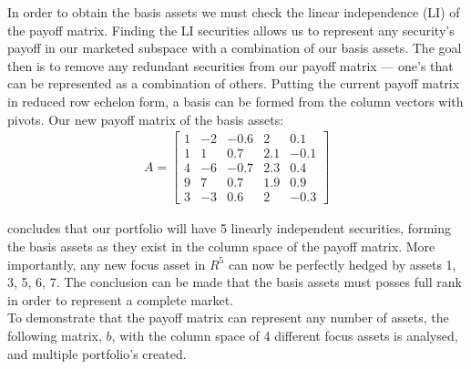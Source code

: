 \documentclass[a4paper,11pt]{report}
\begin{document}
\begin{multicols}{2}
 In order to obtain the basis assets we must check the linear independence (LI) of the payoff matrix. 
Finding the LI securities allows us to represent any security's payoff in our marketed subspace with a combination of our basis assets.
The goal then is to remove any redundant securities from our payoff matrix --- one's that can be represented as a combination of others. 
Putting the current payoff matrix in reduced row echelon form, a basis can be formed from the column vectors with pivots. 
Our new payoff matrix of the basis assets:
\begin{align*}
	A=\left[\begin{array}{ccccc}
		1 & -2 & -0.6 & 2 & 0.1\\ 
		1 & 1 & 0.7 & 2.1 & -0.1\\
		4 & -6 & -0.7 & 2.3 & 0.4\\
		9 & 7 & 0.7 & 1.9 & 0.9\\
		3 & -3  & 0.6 & 2 & -0.3
	\end{array}\right]
\end{align*}

concludes that our portfolio will have 5 linearly independent securities, forming the basis assets as they exist in the column space of the payoff matrix. 
More importantly, any new focus asset in $R^5$ can now be perfectly hedged by assets 1, 3, 5, 6, 7. 
The conclusion can be made that the basis assets must posses full rank in order to represent a complete market. 
\\
\indent
To demonstrate that the payoff matrix can represent any number of assets, the following matrix, $b$, with the column space of 4 different focus assets is analysed, and multiple portfolio's created.


\end{multicols}
\end{document}
